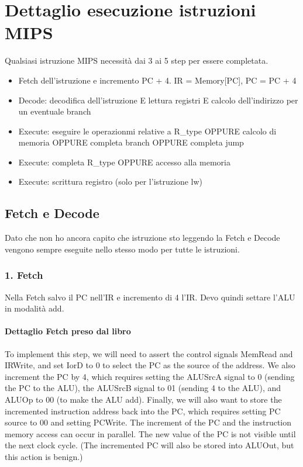 \documentclass[12pt, a4paper, openany]{book}
\begin{document}
\section{Dettaglio esecuzione istruzioni MIPS}
Qualsiasi istruzione MIPS necessità dai 3 ai 5 step per essere completata.
\begin{itemize}
    \item Fetch dell'istruzione e incremento PC + 4. IR = Memory[PC], PC = PC + 4
    \item Decode: decodifica dell'istruzione E lettura registri E calcolo
    dell'indirizzo per un eventuale branch
    \item Execute: eseguire le operazionmi relative a R\_type OPPURE calcolo di memoria
    OPPURE completa branch OPPURE completa jump
    \item Execute: completa R\_type OPPURE accesso alla memoria
    \item Execute: scrittura registro (solo per l'istruzione lw)
\end{itemize}

\subsection{Fetch e Decode}
Dato che non ho ancora capito che istruzione sto leggendo la Fetch e Decode vengono sempre eseguite 
nello stesso modo per tutte le istruzioni.
\subsubsection*{1. Fetch} Nella Fetch salvo il PC nell'IR e incremento di 4 l'IR. Devo quindi settare l'ALU
in modalità add.
\paragraph*{Dettaglio Fetch preso dal libro}
To implement this step, we will need to assert the control signals MemRead and
IRWrite, and set IorD to 0 to select the PC as the source of the address. We also
increment the PC by 4, which requires setting the ALUSrcA signal to 0 (sending the
PC to the ALU), the ALUSrcB signal to 01 (sending 4 to the ALU), and ALUOp to 00
(to make the ALU add). Finally, we will also want to store the incremented instruction
 address back into the PC, which requires setting PC source to 00 and setting
PCWrite. The increment of the PC and the instruction memory access can occur in
parallel. The new value of the PC is not visible until the next clock cycle. (The incremented
PC will also be stored into ALUOut, but this action is benign.)
\end{document}
